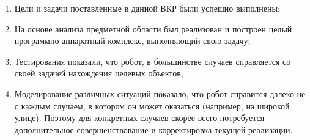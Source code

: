 \begin{enumerate}
  \item Цели и задачи поставленные в данной ВКР были успешно выполнены; 
  \item На основе анализа предметной области был реализован и построен целый программно-аппаратный комплекс, выполняющий свою задачу;
  \item Тестирования показали, что робот, в большинстве случаев справляется со своей задачей нахождения целевых объектов;
  \item Моделирование различных ситуаций показало, что робот справится далеко не с каждым случаем, в котором он может оказаться (например, на широкой улице). Поэтому для конкретных случаев скорее всего потребуется дополнительное совершенствование и корректировка текущей реализации.
\end{enumerate}
